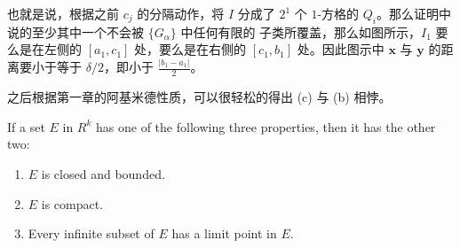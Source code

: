 \documentclass[../poma-notes.tex]{subfiles}
\begin{document}
\begin{anote}
\begin{center}
  \end{center}
  也就是说，根据之前 $c_j$ 的分隔动作，将 $I$ 分成了 $2^1$ 个 $1$-方格的 $Q_i$。那么证明中说的至少其中一个不会被 $\{G_{\alpha}\}$ 中任何有限的
  子类所覆盖，那么如图所示，$I_1$ 要么是在左侧的 $[a_1,c_1]$ 处，要么是在右侧的 $[c_1,b_1]$ 处。因此图示中 $\mathbf{x}$ 与 $\mathbf{y}$
  的距离要小于等于 $\delta/2$，即小于 $\frac{|b_1-a_1|}{2}$。

  之后根据第一章的阿基米德性质，可以很轻松的得出 (c) 与 (b) 相悖。
\end{anote}

\begin{theorem}
  If a set $E$ in $R^k$ has one of the following three properties, then it has the other two:
  \begin{enumerate}[label=(\alph*)]
    \item $E$ is closed and bounded.
    \item $E$ is compact.
    \item Every infinite subset of $E$ has a limit point in $E$.
  \end{enumerate}
\end{theorem}
\end{document}

